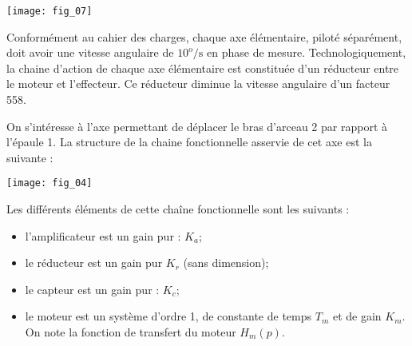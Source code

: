 \begin{center}
\texttt{[image: fig\_07]}
\end{center}

%

Conformément au cahier des charges, chaque axe élémentaire, piloté séparément, doit avoir une vitesse angulaire de $10^{\text{o}}\text{/s}$ en phase de mesure. Technologiquement, la chaine d’action de chaque axe élémentaire est constituée d’un réducteur entre le moteur et l’effecteur. Ce réducteur diminue la vitesse angulaire d'un facteur 558. 


On s’intéresse à l’axe permettant de déplacer le bras d’arceau 2 par rapport à l’épaule 1. La structure de la chaine fonctionnelle asservie de cet axe est la suivante : 
\begin{center}
\texttt{[image: fig\_04]}
\end{center}


Les différents éléments de cette chaîne fonctionnelle sont les suivants :
\begin{itemize}
\item l'amplificateur est un gain pur : $K_a$;
\item le réducteur est un gain pur $K_r$ (sans dimension);
\item le capteur est un gain pur : $K_c$;
\item le moteur est un système d'ordre 1, de constante de temps $T_m$ et de gain $K_m$. On note la fonction de transfert du moteur $H_m (p)$. 
\end{itemize}







